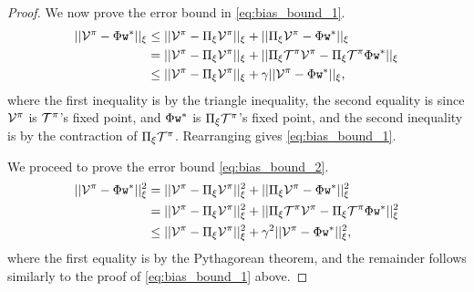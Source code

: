\begin{proof}
We now prove the error bound in \eqref{eq:bias_bound_1}.
\begin{equation*}
\begin{split}
  ||\mathcal{V}^\pi - \Phi {\tt w}^*||_\xi  &\leq ||\mathcal{V}^\pi
-\Pi_\xi \mathcal{V}^\pi||_\xi + ||\Pi_\xi \mathcal{V}^\pi -\Phi {\tt w}^*||_\xi  \\
    &= ||\mathcal{V}^\pi -\Pi_\xi \mathcal{V}^\pi||_\xi + ||\Pi_\xi \mathcal{T}^\pi \mathcal{V}^\pi -\Pi_\xi \mathcal{T}^\pi\Phi {\tt w}^*||_\xi \\
&\leq ||\mathcal{V}^\pi -\Pi_\xi \mathcal{V}^\pi||_\xi + \gamma||\mathcal{V}^\pi-\Phi {\tt w}^*||_\xi,
\end{split}
\end{equation*}
where the first inequality is by the triangle inequality, the second equality is since $\mathcal{V}^\pi$ is $\mathcal{T}^\pi$'s fixed point, and $\Phi {\tt w}^*$ is $\Pi_\xi \mathcal{T}^\pi$'s fixed point, and the second inequality is by the contraction of $\Pi_\xi \mathcal{T}^\pi$. Rearranging gives \eqref{eq:bias_bound_1}.

We proceed to prove the error bound \eqref{eq:bias_bound_2}.
\begin{equation}
\begin{split}
  ||\mathcal{V}^\pi - \Phi {\tt w}^*||_\xi^2  &= ||\mathcal{V}^\pi
-\Pi_\xi \mathcal{V}^\pi||_\xi^2 + ||\Pi_\xi \mathcal{V}^\pi -\Phi {\tt w}^*||_\xi^2  \\
    &= ||\mathcal{V}^\pi -\Pi_\xi \mathcal{V}^\pi||_\xi^2 + ||\Pi_\xi \mathcal{T}^\pi \mathcal{V}^\pi -\Pi_\xi \mathcal{T}^\pi\Phi {\tt w}^*||_\xi^2 \\
&\leq ||\mathcal{V}^\pi -\Pi_\xi \mathcal{V}^\pi||_\xi^2 + \gamma^2||\mathcal{V}^\pi-\Phi {\tt w}^*||_\xi^2,
\end{split}
\end{equation}
where the first equality is by the Pythagorean theorem, and the remainder follows similarly to the proof of \eqref{eq:bias_bound_1} above.

\end{proof}

